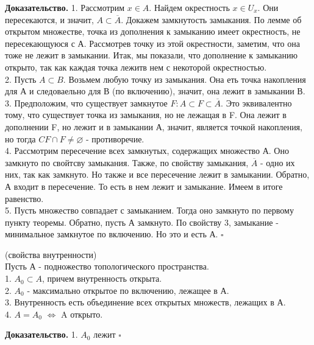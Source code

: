 \textbf{Доказательство.} 1. Рассмотрим $x\in A$. Найдем окрестность
$x\in U_x$. 
Они пересекаются, и значит, $A\subset \overline{A}$. Докажем замкнутость
замыкания. По лемме об открытом множестве, точка из дополнения к замыканию
имеет окрестность, не пересекающуюся с А. Рассмотрев точку из этой окрестности,
заметим, что она тоже не лежит в замыкании. Итак, мы показали, что 
дополнение к замыканию открыто, так как каждая точка лежитв нем
с некоторой окрестностью.\\
2. Пусть $A\subset B$. Возьмем любую точку из замыкания. Она еть точка 
накопления для А и следоваельно для В (по включению), значит, она лежит в 
замыкании В.\\
3. Предположим, что существует замкнутое $F:A\subset F\subset \overline{A}$. 
Это эквивалентно тому, что существует точка из замыкания, но не лежащая в F. 
Она лежит в дополнении F, но лежит и в замыкании А, значит, является точкой 
накопления, но тогда $CF\cap F\ne\varnothing$ - противоречие.\\
4. Рассмотрим пересечение всех замкнутых, содержащих множество А. Оно 
замкнуто по свойтсву замыкания. Также, по свойству замыкания, $\overline{A}$ - 
одно их них, так как замкнуто. Но также и все пересечение лежит в замыкании. 
Обратно, А входит в пересечение. То есть в нем лежит и замыкание. Имеем 
в итоге равенство.\\
5. Пусть множество совпадает с замыканием. Тогда оно замкнуто по первому 
пункту теоремы. Обратно, пусть А замкнуто. По свойству 3, замыкание 
- минимальное замкнутое по включению. Но это и есть А.
$\square$ 
\begin{theor}
    (свойства внутренности)\\
    Пусть А - подножество топологического пространства.\\
    1. $A_0\subset A$, причем внутренность открыта.\\
    2. $A_0$ - максимально открытое по включению, лежащее в А.\\
    3. Внутренность есть объединение всех открытых множеств, лежащих в А.\\
    4.  $A=A_0$  $\Leftrightarrow$ A открыто.
\end{theor}
\textbf{Доказательство.}  
1. $A_0$ лежит
$\square$ 
